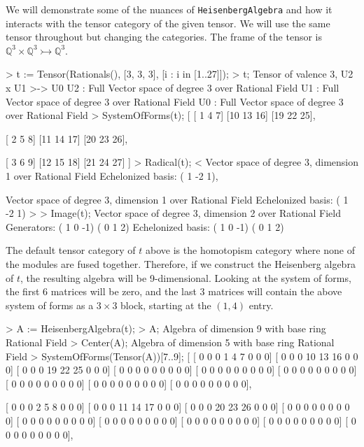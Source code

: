 \begin{example}[CraftingAlgebras]

We will demonstrate some of the nuances of \texttt{HeisenbergAlgebra} and how it interacts with the tensor category of the given tensor. 
We will use the same tensor throughout but changing the categories. 
The frame of the tensor is $\mathbb{Q}^3\times\mathbb{Q}^3\rightarrowtail\mathbb{Q}^3$.
\begin{code}
> t := Tensor(Rationals(), [3, 3, 3], [i : i in [1..27]]);
> t;
Tensor of valence 3, U2 x U1 >-> U0
U2 : Full Vector space of degree 3 over Rational Field
U1 : Full Vector space of degree 3 over Rational Field
U0 : Full Vector space of degree 3 over Rational Field
> SystemOfForms(t);
[
    [ 1  4  7]
    [10 13 16]
    [19 22 25],

    [ 2  5  8]
    [11 14 17]
    [20 23 26],

    [ 3  6  9]
    [12 15 18]
    [21 24 27]
]
> Radical(t);
<
    Vector space of degree 3, dimension 1 over Rational Field
    Echelonized basis:
    ( 1 -2  1),

    Vector space of degree 3, dimension 1 over Rational Field
    Echelonized basis:
    ( 1 -2  1)
>
> Image(t);
Vector space of degree 3, dimension 2 over Rational Field
Generators:
( 1  0 -1)
( 0  1  2)
Echelonized basis:
( 1  0 -1)
( 0  1  2)
\end{code}

The default tensor category of $t$ above is the homotopism category where none of the modules are fused together.
Therefore, if we construct the Heisenberg algebra of $t$, the resulting algebra will be 9-dimensional.
Looking at the system of forms, the first 6 matrices will be zero, and the last 3 matrices will contain the above system of forms as a $3\times 3$ block, starting at the $(1,4)$ entry.
\begin{code}
> A := HeisenbergAlgebra(t);
> A;
Algebra of dimension 9 with base ring Rational Field
> Center(A);
Algebra of dimension 5 with base ring Rational Field
> SystemOfForms(Tensor(A))[7..9];
[
    [ 0  0  0  1  4  7  0  0  0]
    [ 0  0  0 10 13 16  0  0  0]
    [ 0  0  0 19 22 25  0  0  0]
    [ 0  0  0  0  0  0  0  0  0]
    [ 0  0  0  0  0  0  0  0  0]
    [ 0  0  0  0  0  0  0  0  0]
    [ 0  0  0  0  0  0  0  0  0]
    [ 0  0  0  0  0  0  0  0  0]
    [ 0  0  0  0  0  0  0  0  0],

    [ 0  0  0  2  5  8  0  0  0]
    [ 0  0  0 11 14 17  0  0  0]
    [ 0  0  0 20 23 26  0  0  0]
    [ 0  0  0  0  0  0  0  0  0]
    [ 0  0  0  0  0  0  0  0  0]
    [ 0  0  0  0  0  0  0  0  0]
    [ 0  0  0  0  0  0  0  0  0]
    [ 0  0  0  0  0  0  0  0  0]
    [ 0  0  0  0  0  0  0  0  0],


\end{code}
\end{example}
